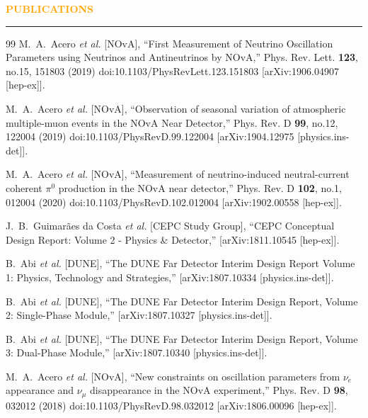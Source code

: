 \documentclass{resume} %
\renewenvironment{rSection}[1]{
\sectionskip
\textcolor{Orange}{\bfseries\MakeUppercase{#1}}
\sectionlineskip
\hrule
\begin{list}{}{
\setlength{\leftmargin}{1.5em}
}
\item[]
}{
\end{list}
}
\begin{document}
\begin{rSection}{ Publications}
\begin{thebibliography}{99}
M.~A.~Acero \textit{et al.} [NOvA],
``First Measurement of Neutrino Oscillation Parameters using Neutrinos and Antineutrinos by NOvA,''
Phys. Rev. Lett. \textbf{123}, no.15, 151803 (2019)
doi:10.1103/PhysRevLett.123.151803
[arXiv:1906.04907 [hep-ex]].

M.~A.~Acero \textit{et al.} [NOvA],
``Observation of seasonal variation of atmospheric multiple-muon events in the NOvA Near Detector,''
Phys. Rev. D \textbf{99}, no.12, 122004 (2019)
doi:10.1103/PhysRevD.99.122004
[arXiv:1904.12975 [physics.ins-det]].

M.~A.~Acero \textit{et al.} [NOvA],
``Measurement of neutrino-induced neutral-current coherent $\pi^0$  production in the NOvA near detector,''
Phys. Rev. D \textbf{102}, no.1, 012004 (2020)
doi:10.1103/PhysRevD.102.012004
[arXiv:1902.00558 [hep-ex]].

J.~B.~Guimar{\~a}es da Costa \textit{et al.} [CEPC Study Group],
``CEPC Conceptual Design Report: Volume 2 - Physics {\&} Detector,''
[arXiv:1811.10545 [hep-ex]].

B.~Abi \textit{et al.} [DUNE],
``The DUNE Far Detector Interim Design Report Volume 1: Physics, Technology and Strategies,''
[arXiv:1807.10334 [physics.ins-det]].

B.~Abi \textit{et al.} [DUNE],
``The DUNE Far Detector Interim Design Report, Volume 2: Single-Phase Module,''
[arXiv:1807.10327 [physics.ins-det]].

B.~Abi \textit{et al.} [DUNE],
``The DUNE Far Detector Interim Design Report, Volume 3: Dual-Phase Module,''
[arXiv:1807.10340 [physics.ins-det]].

M.~A.~Acero \textit{et al.} [NOvA],
``New constraints on oscillation parameters from $\nu_e$ appearance and $\nu_\mu$ disappearance in the NOvA experiment,''
Phys. Rev. D \textbf{98}, 032012 (2018)
doi:10.1103/PhysRevD.98.032012
[arXiv:1806.00096 [hep-ex]].


\end{thebibliography}
\end{rSection}
\end{document}
